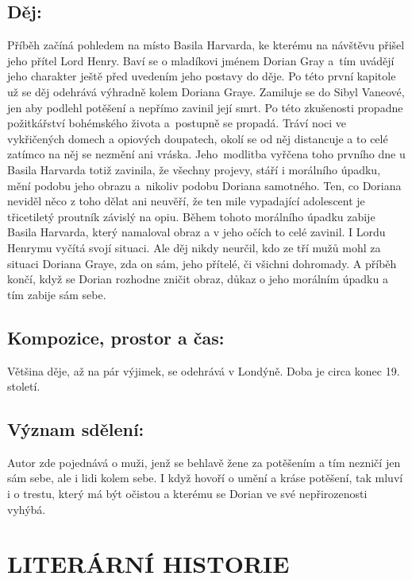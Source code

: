 \documentclass{extarticle} %
\begin{document}
\subsection*{Děj:}
\noindent 
Příběh začíná pohledem na místo Basila Harvarda, ke kterému na návštěvu přišel jeho přítel Lord Henry.
Baví se o mladíkovi jménem Dorian Gray a~tím uvádějí jeho charakter ještě před uvedením jeho postavy do děje.
Po této první kapitole už se děj odehrává výhradně kolem Doriana Graye.
Zamiluje se do Sibyl Vaneové, jen aby podlehl potěšení a nepřímo zavinil její smrt.
Po této zkušenosti propadne požitkářství bohémského života a~postupně se propadá.
Tráví noci ve vykřičených domech a opiových doupatech, okolí se od něj distancuje a to celé zatímco na něj se nezmění ani vráska.
Jeho~modlitba vyřčena toho prvního dne u Basila Harvarda totiž zavinila, že všechny projevy, stáří i morálního úpadku, mění podobu jeho obrazu a~nikoliv podobu Doriana samotného.
Ten, co Doriana neviděl něco z toho dělat ani neuvěří, že ten mile vypadající adolescent je třicetiletý proutník závislý na opiu.
Během tohoto morálního úpadku zabije Basila Harvarda, který namaloval obraz a v jeho očích to celé zavinil.
I Lordu Henrymu vyčítá svojí situaci.
Ale děj nikdy neurčil, kdo ze tří mužů mohl za situaci Doriana Graye, zda on sám, jeho přítelé, či všichni dohromady.
A příběh končí, když se Dorian rozhodne zničit obraz, důkaz o jeho morálním úpadku a tím zabije sám sebe.

\subsection*{Kompozice, prostor a čas:}
\noindent 
Většina děje, až na pár výjimek, se odehrává v Londýně. Doba je circa konec 19. století.

\subsection*{Význam sdělení:}
\noindent 
Autor zde pojednává o muži, jenž se behlavě žene za potěšením a tím nezničí jen sám sebe, ale i lidi kolem sebe.
I když hovoří o umění a kráse potěšení, tak mluví i o trestu, který má být očistou a kterému se Dorian ve své nepřirozenosti vyhýbá.

\section*{LITERÁRNÍ HISTORIE}

\end{document}
